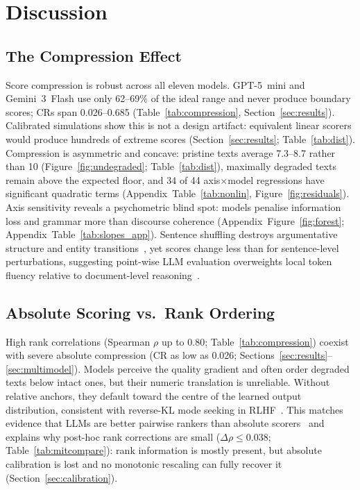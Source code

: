\documentclass[11pt]{article}
\begin{document}
\section{Discussion}
\label{sec:discussion}

\subsection{The Compression Effect}

Score compression is robust across all eleven models. GPT-5~mini and
Gemini~3~Flash use only 62--69\% of the ideal range and never produce
boundary scores; CRs span 0.026--0.685 (Table~\ref{tab:compression},
Section~\ref{sec:results}). Calibrated simulations show this is not a
design artifact: equivalent linear scorers would produce hundreds of
extreme scores (Section~\ref{sec:results}; Table~\ref{tab:dist}).
Compression is asymmetric and concave: pristine texts average 7.3--8.7
rather than 10 (Figure~\ref{fig:undegraded}; Table~\ref{tab:dist}),
maximally degraded texts remain above the expected floor, and 34 of 44
axis$\times$model regressions have significant quadratic terms
(Appendix~Table~\ref{tab:nonlin}, Figure~\ref{fig:residuals}). Axis
sensitivity reveals a psychometric blind spot: models penalise
information loss and grammar more than discourse coherence
(Appendix~Figure~\ref{fig:forest}; Appendix~Table~\ref{tab:slopes_app}). Sentence
shuffling destroys argumentative structure and entity transitions~\citep{barzilay2008modeling},
yet scores change less than for sentence-level perturbations, suggesting
point-wise LLM evaluation overweights local token fluency relative to
document-level reasoning~\citep{lapata2005automatic}.

\subsection{Absolute Scoring vs.\ Rank Ordering}

High rank correlations (Spearman $\rho$ up to 0.80;
Table~\ref{tab:compression}) coexist with severe absolute compression
(CR as low as 0.026; Sections~\ref{sec:results}--\ref{sec:multimodel}).
Models perceive the quality gradient and often order degraded texts
below intact ones, but their numeric translation is unreliable. Without
relative anchors, they default toward the centre of the learned output
distribution, consistent with reverse-KL mode seeking in RLHF~\citep{rafailov2023direct}.
This matches evidence that LLMs are better pairwise rankers than absolute
scorers~\citep{zheng2023judging,liu2023geval} and explains why post-hoc
rank corrections are small ($\Delta\rho\leq0.038$;
Table~\ref{tab:mitcompare}): rank information is mostly present, but
absolute calibration is lost and no monotonic rescaling can fully recover
it (Section~\ref{sec:calibration}).
\end{document}
